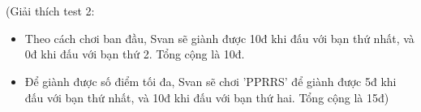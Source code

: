  

 

(Giải thích test 2:
\begin{itemize}
	\item Theo cách chơi ban đầu, Svan sẽ giành được 10đ khi đấu với bạn thứ nhất, và 0đ khi đấu với bạn thứ 2. Tổng cộng là 10đ.
	\item Để giành được số điểm tối đa, Svan sẽ chơi 'PPRRS' để giành được 5đ khi đấu với bạn thứ nhất, và 10đ khi đấu với bạn thứ hai. Tổng cộng là 15đ)
\end{itemize}

 
